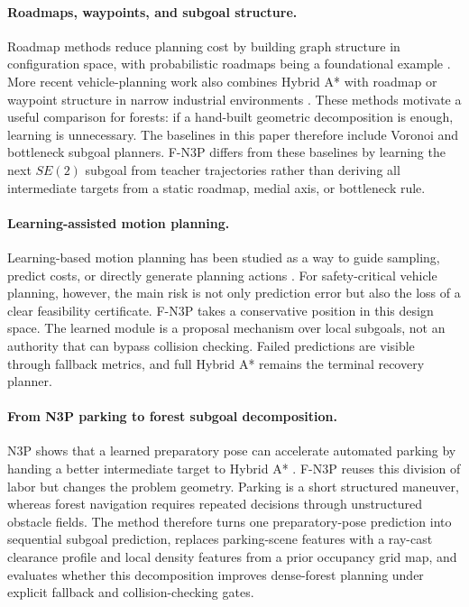 \documentclass[11pt,a4paper]{article}
\begin{document}
\paragraph{Roadmaps, waypoints, and subgoal structure.}
Roadmap methods reduce planning cost by building graph structure in configuration space, with probabilistic roadmaps being a foundational example \cite{Kavraki1996PRM}. More recent vehicle-planning work also combines Hybrid A* with roadmap or waypoint structure in narrow industrial environments \cite{Bonetti2023Roadmap}. These methods motivate a useful comparison for forests: if a hand-built geometric decomposition is enough, learning is unnecessary. The baselines in this paper therefore include Voronoi and bottleneck subgoal planners. F-N3P differs from these baselines by learning the next $SE(2)$ subgoal from teacher trajectories rather than deriving all intermediate targets from a static roadmap, medial axis, or bottleneck rule.

\paragraph{Learning-assisted motion planning.}
Learning-based motion planning has been studied as a way to guide sampling, predict costs, or directly generate planning actions \cite{Wang2021LearningMotionPlanning}. For safety-critical vehicle planning, however, the main risk is not only prediction error but also the loss of a clear feasibility certificate. F-N3P takes a conservative position in this design space. The learned module is a proposal mechanism over local subgoals, not an authority that can bypass collision checking. Failed predictions are visible through fallback metrics, and full Hybrid A* remains the terminal recovery planner.

\paragraph{From N3P parking to forest subgoal decomposition.}
N3P shows that a learned preparatory pose can accelerate automated parking by handing a better intermediate target to Hybrid A* \cite{Xue2026N3P}. F-N3P reuses this division of labor but changes the problem geometry. Parking is a short structured maneuver, whereas forest navigation requires repeated decisions through unstructured obstacle fields. The method therefore turns one preparatory-pose prediction into sequential subgoal prediction, replaces parking-scene features with a ray-cast clearance profile and local density features from a prior occupancy grid map, and evaluates whether this decomposition improves dense-forest planning under explicit fallback and collision-checking gates.
\end{document}

